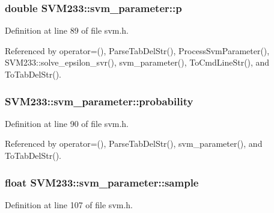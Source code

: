 \subsubsection[{\texorpdfstring{p}{p}}]{\setlength{\rightskip}{0pt plus 5cm}double S\+V\+M233\+::svm\+\_\+parameter\+::p}\hypertarget{struct_s_v_m233_1_1svm__parameter_abb3a034727f945d57e243c98f2ce3bd4}{}\label{struct_s_v_m233_1_1svm__parameter_abb3a034727f945d57e243c98f2ce3bd4}


Definition at line 89 of file svm.\+h.



Referenced by operator=(), Parse\+Tab\+Del\+Str(), Process\+Svm\+Parameter(), S\+V\+M233\+::solve\+\_\+epsilon\+\_\+svr(), svm\+\_\+parameter(), To\+Cmd\+Line\+Str(), and To\+Tab\+Del\+Str().

\subsubsection[{\texorpdfstring{probability}{probability}}]{ S\+V\+M233\+::svm\+\_\+parameter\+::probability}\hypertarget{struct_s_v_m233_1_1svm__parameter_a361cd1b3984d025010e839afc3335197}{}\label{struct_s_v_m233_1_1svm__parameter_a361cd1b3984d025010e839afc3335197}


Definition at line 90 of file svm.\+h.



Referenced by operator=(), Parse\+Tab\+Del\+Str(), svm\+\_\+parameter(), and To\+Tab\+Del\+Str().

\subsubsection[{\texorpdfstring{sample}{sample}}]{\setlength{\rightskip}{0pt plus 5cm}float S\+V\+M233\+::svm\+\_\+parameter\+::sample}\hypertarget{struct_s_v_m233_1_1svm__parameter_a63dd6c465973afa907155971db828985}{}\label{struct_s_v_m233_1_1svm__parameter_a63dd6c465973afa907155971db828985}


Definition at line 107 of file svm.\+h.




